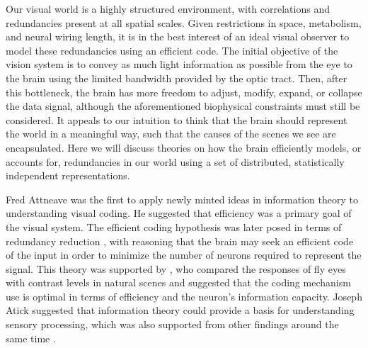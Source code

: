 Our visual world is a highly structured environment, with correlations and redundancies present at all spatial scales. Given restrictions in space, metabolism, and neural wiring length, it is in the best interest of an ideal visual observer to model these redundancies using an efficient code. The initial objective of the vision system is to convey as much light information as possible from the eye to the brain using the limited bandwidth provided by the optic tract. Then, after this bottleneck, the brain has more freedom to adjust, modify, expand, or collapse the data signal, although the aforementioned biophysical constraints must still be considered. It appeals to our intuition to think that the brain should represent the world in a meaningful way, such that the causes of the scenes we see are encapsulated. Here we will discuss theories on how the brain efficiently models, or accounts for, redundancies in our world using a set of distributed, statistically independent representations.

Fred Attneave \citeyearpar{attneave1954some} was the first to apply newly minted ideas in information theory to understanding visual coding. He suggested that efficiency was a primary goal of the visual system. The efficient coding hypothesis was later posed in terms of redundancy reduction \parencite{barlow1961possible}, with reasoning that the brain may seek an efficient code of the input in order to minimize the number of neurons required to represent the signal. This theory was supported by \parencite{laughlin1981simple}, who compared the responses of fly eyes with contrast levels in natural scenes and suggested that the coding mechanism use is optimal in terms of efficiency and the neuron's information capacity. Joseph Atick \citeyearpar{atick1992could} suggested that information theory could provide a basis for understanding sensory processing, which was also supported from other findings around the same time \parencite{hateren1992theory, field1994goal}.

